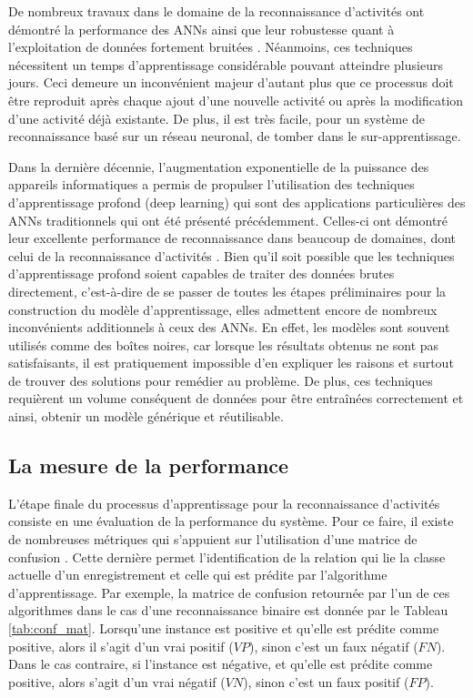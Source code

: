 De nombreux travaux dans le domaine de la reconnaissance d'activités ont démontré la performance des \acsp{ANN} ainsi que leur robustesse quant à l'exploitation de données fortement bruitées \citep{Parkka2006, Delachaux2013}. Néanmoins, ces techniques nécessitent un temps d'apprentissage considérable pouvant atteindre plusieurs jours. Ceci demeure un inconvénient majeur d'autant plus que ce processus doit être reproduit après chaque ajout d'une nouvelle activité ou après la modification d'une activité déjà existante. De plus, il est très facile, pour un système de reconnaissance basé sur un réseau neuronal, de tomber dans le sur-apprentissage.

Dans la dernière décennie, l'augmentation exponentielle de la puissance des appareils informatiques a permis de propulser l'utilisation des techniques d'apprentissage profond (deep learning) qui sont des applications particulières des \acsp{ANN} traditionnels qui ont été présenté précédemment. Celles-ci ont démontré leur excellente performance de reconnaissance dans beaucoup de domaines, dont celui de la reconnaissance d'activités \citep{Yang2015, Li2016, Wang2018}. Bien qu'il soit possible que les techniques d'apprentissage profond soient capables de traiter des données brutes directement, c'est-à-dire de se passer de toutes les étapes préliminaires pour la construction du modèle d'apprentissage, elles admettent encore de nombreux inconvénients additionnels à ceux des \acsp{ANN}. En effet, les modèles sont souvent utilisés comme des boîtes noires, car lorsque les résultats obtenus ne sont pas satisfaisants, il est pratiquement impossible d'en expliquer les raisons et surtout de trouver des solutions pour remédier au problème. De plus, ces techniques requièrent un volume conséquent de données pour être entraînées correctement et ainsi, obtenir un modèle générique et réutilisable.

\subsection{La mesure de la performance}

L'étape finale du processus d'apprentissage pour la reconnaissance d'activités consiste en une évaluation de la performance du système. Pour ce faire, il existe de nombreuses métriques qui s'appuient sur l'utilisation d'une matrice de confusion \citep{Fawcett2006}. Cette dernière permet l'identification de la relation qui lie la classe actuelle d'un enregistrement et celle qui est prédite par l'algorithme d'apprentissage. Par exemple, la matrice de confusion retournée par l'un de ces algorithmes dans le cas d'une reconnaissance binaire est donnée par le Tableau \ref{tab:conf_mat}. Lorsqu'une instance est positive et qu'elle est prédite comme positive, alors il s'agit d'un vrai positif ($VP$), sinon c'est un faux négatif ($FN$). Dans le cas contraire, si l'instance est négative, et qu'elle est prédite comme positive, alors s'agit d'un vrai négatif ($VN$), sinon c'est un faux positif ($FP$).

